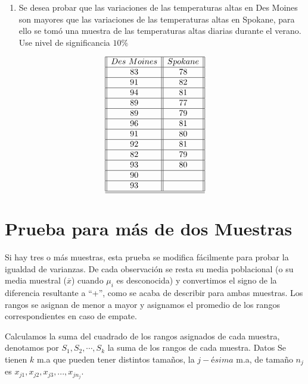 \documentclass[a4paper,oneside,openany]{book}
\providecommand{\tightlist}{%
  \setlength{\itemsep}{0pt}\setlength{\parskip}{0pt}}
\begin{document}
\begin{enumerate}
\def\labelenumi{\arabic{enumi}.}
\setcounter{enumi}{1}
\tightlist
\item
  Se desea probar que las variaciones de las temperaturas altas en Des
  Moines son mayores que las variaciones de las temperaturas altas en
  Spokane, para ello se tomó una muestra de las temperaturas altas
  diarias durante el verano. Use nivel de significancia \(10\%\)
\end{enumerate}

\[
\begin{equation*}
\begin{array}{||c| |c||} 
\hline 
Des \ Moines& Spokane \\ 
 \hline
83&78\\
 \hline
91&82\\
 \hline
94&81\\
 \hline
89&77\\
 \hline
89&79\\
 \hline
96&81\\
 \hline
91&80\\
 \hline
92&81\\
 \hline
82&79\\
 \hline
93&80\\
 \hline
90&\\
 \hline
93&\\
 \hline
\hline
\end{array}
\end{equation*}
\]

\chapter{Prueba para más de dos
Muestras}\label{prueba-para-muxe1s-de-dos-muestras}

Si hay tres o más muestras, esta prueba se modifica fácilmente para
probar la igualdad de varianzas. De cada observación se resta su media
poblacional (o su media muestral (\(\overline{x}\)) cuando \(\mu_{i}\)
es desconocida) y convertimos el signo de la diferencia resultante a
``+'', como se acaba de describir para ambas muestras. Los rangos se
asignan de menor a mayor y asignamos el promedio de los rangos
correspondientes en caso de empate.

Calculamos la suma del cuadrado de los rangos asignados de cada muestra,
denotamos por \(S_{1},S_{2},\cdots,S_{k}\) la suma de los rangos de cada
muestra. Datos Se tienen \(k\) m.a que pueden tener distintos tamaños,
la \(j-ésima\) m.a, de tamaño \(n_j\) es
\(x_{j1},x_{j2},x_{j3},...,x_{jn_j}\).
\end{document}

